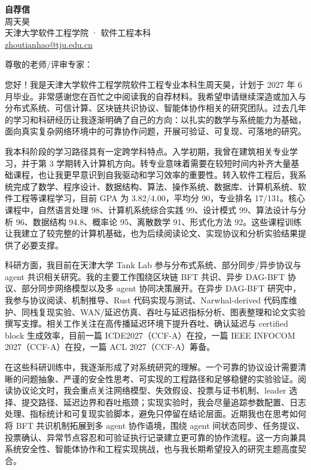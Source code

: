 \documentclass[11pt,a4paper]{article}
\begin{document}
\begin{center}
  {\fontsize{22}{28}\selectfont\bfseries 自荐信}\\[8pt]
  {\large 周天昊}\\[4pt]
  天津大学软件工程学院 · 软件工程本科\\
  \href{mailto:zhoutianhao@tju.edu.cn}{zhoutianhao@tju.edu.cn}
\end{center}

\vspace{0.6em}

尊敬的老师/评审专家：

您好！我是天津大学软件工程学院软件工程专业本科生周天昊，计划于 2027 年 6 月毕业。非常感谢您在百忙之中阅读我的自荐材料。我希望申请继续深造或加入与分布式系统、可信计算、区块链共识协议、智能体协作相关的研究团队。过去几年的学习和科研经历让我逐渐明确了自己的方向：以扎实的数学与系统能力为基础，面向真实复杂网络环境中的可靠协作问题，开展可验证、可复现、可落地的研究。

我本科阶段的学习路径具有一定跨学科特点。入学初期，我曾在建筑相关专业学习，并于第 3 学期转入计算机方向。转专业意味着需要在较短时间内补齐大量基础课程，也让我更早意识到自我驱动和学习效率的重要性。转入软件工程后，我系统完成了数学、程序设计、数据结构、算法、操作系统、数据库、计算机系统、软件工程等课程学习，目前 GPA 为 3.82/4.00，平均分 90，专业排名 17/131。核心课程中，自然语言处理 98、计算机系统综合实践 99、设计模式 99、算法设计与分析 96、数据结构 94.8、概率论 95、离散数学 91、形式化方法 92。这些课程训练让我建立了较完整的计算机基础，也为后续阅读论文、实现协议和分析实验结果提供了必要支撑。

科研方面，我目前在天津大学 Tank Lab 参与分布式系统、部分同步/异步协议与 agent 共识相关研究。我的主要工作围绕区块链 BFT 共识、异步 DAG-BFT 协议、部分同步网络模型以及多 agent 协同决策展开。在异步 DAG-BFT 研究中，我参与协议阅读、机制推导、Rust 代码实现与测试、Narwhal-derived 代码库维护、同栈复现实验、WAN/延迟仿真、吞吐与延迟指标分析、图表整理和论文实验撰写支撑。相关工作关注在高传播延迟环境下提升吞吐、确认延迟与 certified block 生成效率，目前一篇 ICDE2027（CCF-A）在投，一篇 IEEE INFOCOM 2027（CCF-A）在投，一篇 ACL 2027（CCF-A）筹备。

在这些科研训练中，我逐渐形成了对系统研究的理解。一个可靠的协议设计需要清晰的问题抽象、严谨的安全性思考、可实现的工程路径和足够稳健的实验验证。阅读协议论文时，我会重点关注网络模型、失效假设、投票与证书机制、leader 选择、提交路径、延迟边界和吞吐瓶颈；实现实验时，我会尽量追踪参数配置、日志处理、指标统计和可复现实验脚本，避免只停留在结论层面。近期我也在思考如何将 BFT 共识机制拓展到多 agent 协作语境，围绕 agent 间状态同步、任务提议、投票确认、异常节点容忍和可验证执行记录建立更可靠的协作流程。这一方向兼具系统安全性、智能体协作和工程实现挑战，也与我长期希望投入的研究主题高度契合。
\end{document}
